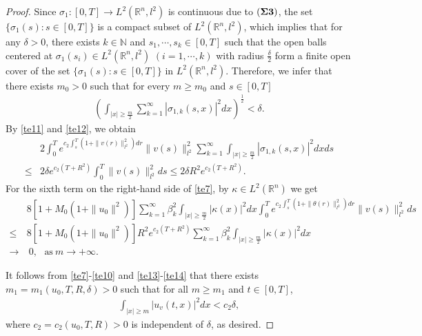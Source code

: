 \documentclass[11pt]{article}
\numberwithin{equation}{section}
\theoremstyle{plain}
\def\geq{\geqslant}
\def\leq{\leqslant}
\begin{document}
\begin{proof}
 Since $\sigma_{1} :[0,T]\rightarrow L^2(\mathbb{R}^n, l^2)$ is continuous due to   $({\bf \Sigma 3})$,
 the set $\{ \sigma_{1} (s): s\in [0,T] \}$ is a compact subset of $L^2(\mathbb{R}^n, l^2)$,
 which implies that for any $\delta  >0$,
 there exists $k \in \mathbb{N}$ and $s_1, \cdots, s_k \in [0,T]$
 such that the open balls centered at $\sigma_1(s_i) \in L^2(\mathbb{R}^n, l^2)$ $(i=1,\cdots,k)$ with radius
 $\frac{\delta }{2}$ form a finite open cover of the set
 $\{ \sigma_{1} (s): s \in [0,T] \}$ in $L^2(\mathbb{R}^n, l^2)$.
 Therefore, we infer that there exists $m_0>0$ such that for every $m \geq m_0$ and $s \in [0,T]$
\begin{align} \label{te12}
       \left( \int_{|x| \geq \frac{m}{2}}
                 \sum_{k=1}^{\infty}
                    | \sigma_{1,k}(s,x) |^2 dx
       \right)^{\frac{1}{2}}
       < \delta.
\end{align}
By \eqref{te11} and \eqref{te12}, we obtain
\begin{align} \label{te13}
      & 2 \int_0^T e^{ c_2 \int_s^T \left( 1 + \| v(r) \|_{l^2}^2 \right) dr }
                     \| v(s) \|_{l^2}^2
                       \sum_{k=1}^{\infty}
                         \int_{|x| \geq \frac{m}{2}} |\sigma_{1,k} (s,x)|^2 dx
          ds
          \nonumber \\
 \leq & 2 \delta  e^{ c_2 \left( T + R^2 \right) }
                       \int_0^T \| v(s) \|_{l^2}^2 ds
 \leq  2 \delta  R^2  e^{ c_2 \left( T + R^2 \right) }.
\end{align}
 For the sixth term on the right-hand side of \eqref{te7},
 by $\kappa \in L^2(\mathbb{R}^n)$  we get
\begin{align} \label{te14}
       & 8 \left[ 1 + M_0(1 + \|u_0\|^2) \right]
              \sum_{k=1}^{\infty} \beta_k^2
                   \int_{|x| \geq \frac{m}{2}} |\kappa(x)|^2 dx
                         \int_0^T e^{ c_2 \int_s^T \left( 1 + \| \theta(r) \|_{l^2}^2 \right) dr }
                                  \| v(s) \|_{l^2}^2
                         ds
                           \nonumber \\
  \leq & 8 \left[ 1 + M_0(1 + \|u_0\|^2) \right]
           R^2 e^{ c_2 \left(T + R^2\right) }
               \sum_{k=1}^{\infty} \beta_k^2
                    \int_{|x| \geq \frac{m}{2}} |\kappa(x)|^2 dx
                            \nonumber \\
  \rightarrow & \ 0, \ \ \   \text{as} \ m \to +\infty.
\end{align}

 It follows from \eqref{te7}-\eqref{te10} and \eqref{te13}-\eqref{te14} that there exists
     $m_1 = m_1 (u_0, T, R,  \delta) > 0$
 such that for all $m \geq m_1$ and $t \in [0, T]$,
\begin{align*}
      \int_{|x| \geq m} |u_v(t,x)|^2 dx < c_2 \delta,
\end{align*}
where $c_2=c_2(u_0, T, R)>0$
is independent of $\delta$,
as desired.
\end{proof}
\end{document}
